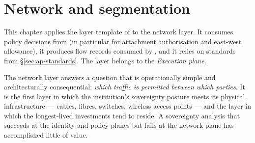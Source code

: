 
\chapter{Network and segmentation}
\label{ch:network}

\begin{caveatbox}[Dependencies]
\noindent This chapter applies the layer template of
 to the network layer. It consumes policy
decisions from  (in particular for attachment
authorisation and east-west allowance), it produces flow records
consumed by , and it relies on standards
from \S\ref{sec:ap-standards}. The layer belongs to the \emph{Execution plane}.
\end{caveatbox}

The network layer answers a question that is operationally simple
and architecturally consequential: \emph{which traffic is permitted
between which parties}. It is the first layer in which the
institution's sovereignty posture meets its physical infrastructure
--- cables, fibres, switches, wireless access points --- and the
layer in which the longest-lived investments tend to reside. A
sovereignty analysis that succeeds at the identity and policy planes
but fails at the network plane has accomplished little of value.

